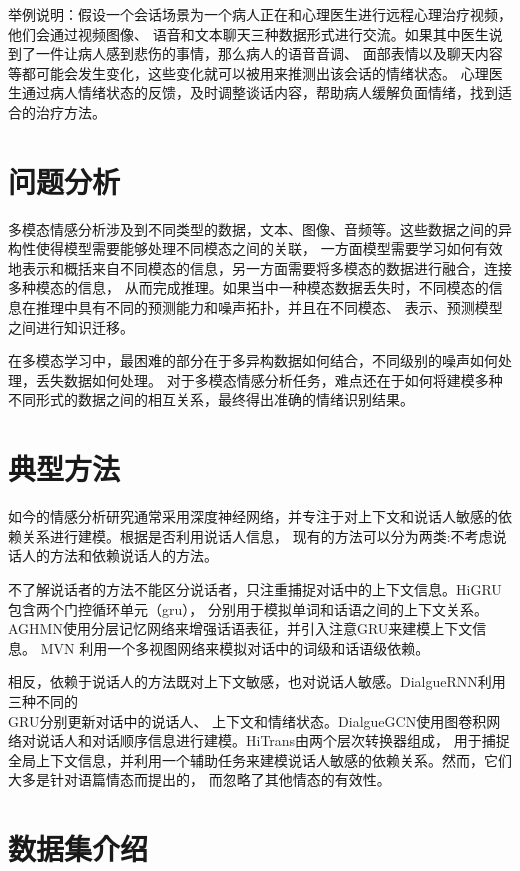\documentclass[11pt]{article}
\begin{document}
    举例说明：假设一个会话场景为一个病人正在和心理医生进行远程心理治疗视频，他们会通过视频图像、
    语音和文本聊天三种数据形式进行交流。如果其中医生说到了一件让病人感到悲伤的事情，那么病人的语音音调、
    面部表情以及聊天内容等都可能会发生变化，这些变化就可以被用来推测出该会话的情绪状态。
    心理医生通过病人情绪状态的反馈，及时调整谈话内容，帮助病人缓解负面情绪，找到适合的治疗方法。


    \section{问题分析}
    多模态情感分析涉及到不同类型的数据，文本、图像、音频等。这些数据之间的异构性使得模型需要能够处理不同模态之间的关联，
    一方面模型需要学习如何有效地表示和概括来自不同模态的信息，另一方面需要将多模态的数据进行融合，连接多种模态的信息，
    从而完成推理。如果当中一种模态数据丢失时，不同模态的信息在推理中具有不同的预测能力和噪声拓扑，并且在不同模态、
    表示、预测模型之间进行知识迁移。

    在多模态学习中，最困难的部分在于多异构数据如何结合，不同级别的噪声如何处理，丢失数据如何处理。
    对于多模态情感分析任务，难点还在于如何将建模多种不同形式的数据之间的相互关系，最终得出准确的情绪识别结果。


    \section{典型方法}
    
    如今的情感分析研究通常采用深度神经网络，并专注于对上下文和说话人敏感的依赖关系进行建模。根据是否利用说话人信息，
    现有的方法可以分为两类:不考虑说话人的方法和依赖说话人的方法。

    不了解说话者的方法不能区分说话者，只注重捕捉对话中的上下文信息。HiGRU包含两个门控循环单元（gru），
    分别用于模拟单词和话语之间的上下文关系。AGHMN使用分层记忆网络来增强话语表征，并引入注意GRU来建模上下文信息。
    MVN 利用一个多视图网络来模拟对话中的词级和话语级依赖。
    
    相反，依赖于说话人的方法既对上下文敏感，也对说话人敏感。DialgueRNN利用三种不同的\\GRU分别更新对话中的说话人、
    上下文和情绪状态。DialgueGCN使用图卷积网络对说话人和对话顺序信息进行建模。HiTrans由两个层次转换器组成，
    用于捕捉全局上下文信息，并利用一个辅助任务来建模说话人敏感的依赖关系。然而，它们大多是针对语篇情态而提出的，
    而忽略了其他情态的有效性。
    
    
    \section{数据集介绍}
\end{document}

